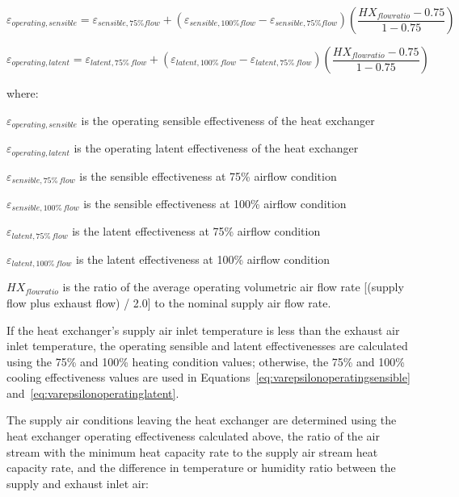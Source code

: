 \begin{equation}
{\varepsilon_{operating,sensible}} = {\varepsilon_{sensible,75\%flow}} + ({\varepsilon_{sensible,100\%flow}} - {\varepsilon_{sensible,75\%flow}})\left( {\frac{{H{X_{flowratio}} - 0.75}}{{1 - 0.75}}} \right)
\label{eq:varepsilonoperatingsensible}
\end{equation}

\begin{equation}
{\varepsilon_{operating,latent}} = {\varepsilon_{latent,75\% \,flow}} + ({\varepsilon_{latent,100\% \,flow}} - {\varepsilon_{latent,75\% \,flow}})\left( {\frac{{H{X_{flowratio}} - 0.75}}{{1 - 0.75}}} \right)
\label{eq:varepsilonoperatinglatent}
\end{equation}

where:

\({\varepsilon_{operating,sensible}}\) is the operating sensible effectiveness of the heat exchanger

\({\varepsilon_{operating,latent}}\) is the operating latent effectiveness of the heat exchanger

\({\varepsilon_{sensible,75\% \,flow}}\) is the sensible effectiveness at 75\% airflow condition

\({\varepsilon_{sensible,100\% \,flow}}\) is the sensible effectiveness at 100\% airflow condition

\({\varepsilon_{latent,75\% \,flow}}\) is the latent effectiveness at 75\% airflow condition

\({\varepsilon_{latent,100\% \,flow}}\) is the latent effectiveness at 100\% airflow condition

\(H{X_{flowratio}}\) is the ratio of the average operating volumetric air flow rate {[}(supply flow plus exhaust flow) / 2.0{]} to the nominal supply air flow rate.

If the heat exchanger's supply air inlet temperature is less than the exhaust air inlet temperature, the operating sensible and latent effectivenesses are calculated using the 75\% and 100\% heating condition values; otherwise, the 75\% and 100\% cooling effectiveness values are used in Equations~\ref{eq:varepsilonoperatingsensible} and~\ref{eq:varepsilonoperatinglatent}.

The supply air conditions leaving the heat exchanger are determined using the heat exchanger operating effectiveness calculated above, the ratio of the air stream with the minimum heat capacity rate to the supply air stream heat capacity rate, and the difference in temperature or humidity ratio between the supply and exhaust inlet air:

